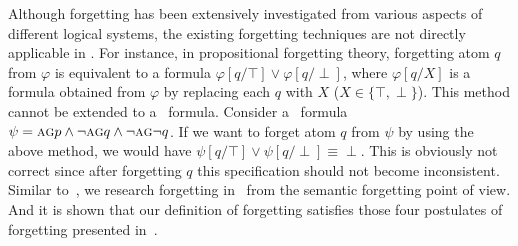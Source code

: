 \documentclass{article}
\begin{document}
Although forgetting has been extensively investigated from various aspects of different logical systems, the existing forgetting techniques are not directly applicable in \CTL.
For instance, in propositional forgetting theory, forgetting atom $q$ from $\varphi$ is equivalent to a formula $\varphi[q/\top] \vee \varphi[q/\perp]$, where $\varphi[q/X]$ is a formula obtained from $\varphi$ by replacing each $q$ with $X$ ($X\in \{\top, \perp\}$).
This method cannot be extended to a \CTL\ formula. Consider a \CTL\ formula $\psi=\textsc{a}\textsc{g} p \wedge \neg \textsc{a}\textsc{g} q \wedge \neg \textsc{a}\textsc{g} \neg q$. If we want to forget
atom $q$ from $\psi$ by using the above method, we would have $\psi[q/\top] \vee \psi[q/\perp] \equiv \perp$. This is obviously not correct since after forgetting $q$ this specification should
not become inconsistent.
Similar to~\cite{Yan:AIJ:2009}, we research forgetting in \CTL\ from the semantic forgetting point of view.
And it is shown that our definition of forgetting satisfies those four postulates of forgetting presented in~\cite{Yan:AIJ:2009}.
\end{document}

